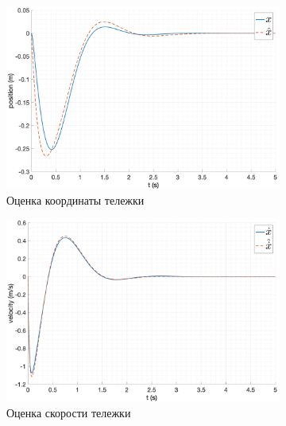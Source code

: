 \begin{figure}[ht!]
    \centering
    \begin{subfigure}[b]{0.45\textwidth}
        \includegraphics[width=\textwidth]{media/plots/modal_observer/observer_x_cmp_1.png}
        \caption{Оценка координаты тележки}
        \label{fig:observer_x_cmp_1}
    \end{subfigure}
    \begin{subfigure}[b]{0.45\textwidth}
        \includegraphics[width=\textwidth]{media/plots/modal_observer/observer_dotx_cmp_1.png}
        \caption{Оценка скорости тележки}
        \label{fig:observer_dotx_cmp_1}
    \end{subfigure}
    \begin{subfigure}[b]{0.45\textwidth}

\end{subfigure}
\end{figure}
